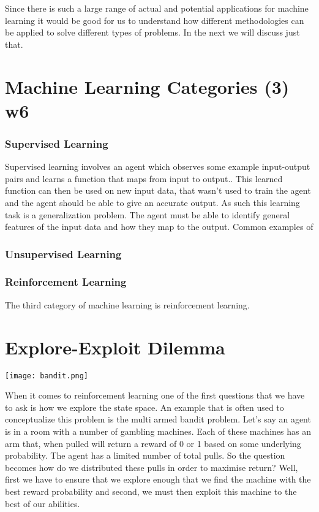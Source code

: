 Since there is such a large range of actual and potential applications for machine learning it would be good for
us to understand how different methodologies can be applied to solve different types of problems.
In the next we will discuss just that.


\section{Machine Learning Categories (3) w6}\label{sec:mlCategories}

\subsubsection{Supervised Learning}
Supervised learning involves an agent which observes some example input-output pairs and learns
a function that maps from input to output.\cite{russell2016artificial}.
This learned function can then be used on new input data, that wasn't used to train the agent and the
agent should be able to give an accurate output.
As such this learning task is a generalization problem.
The agent must be able to identify general features of the input data and how they map to the output.
Common examples of 


\subsubsection{Unsupervised Learning}
\subsubsection{Reinforcement Learning}
The third category of machine learning is reinforcement learning.

\section{Explore-Exploit Dilemma}\label{sec:exploreExploit}
\begin{center}
    \texttt{[image: bandit.png]}
\end{center}
When it comes to reinforcement learning one of the first questions that we have to ask is how we explore
the state space.
An example that is often used to conceptualize this problem is the multi armed bandit problem.
Let's say an agent is in a room with a number of gambling machines.
Each of these machines has an arm that, when pulled will return a reward of 0 or 1 based on some underlying
probability\cite{kaelbling1996reinforcement}.
The agent has a limited number of total pulls.
So the question becomes how do we distributed these pulls in order to maximise return?
Well, first we have to ensure that we explore enough that we find the machine with the best reward probability
and second, we must then exploit this machine to the best of our abilities.

